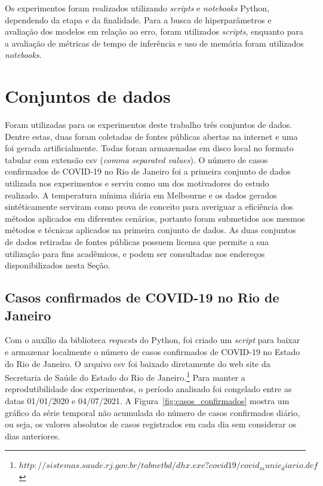 Os experimentos foram realizados utilizando \textit{scripts} e \textit{notebooks} Python, dependendo da etapa e da finalidade. Para a busca de hiperparâmetros e avaliação dos modelos em relação ao erro, foram utilizados \textit{scripts}, enquanto para a avaliação de métricas de tempo de inferência e uso de memória foram utilizados \textit{notebooks}.

\section{Conjuntos de dados}
Foram utilizadas para os experimentos deste trabalho três conjuntos de dados. Dentre estas, duas foram coletadas de fontes públicas abertas na internet e uma foi gerada artificialmente. Todas foram armazenadas em disco local no formato tabular com extensão csv (\textit{comma separated values}). O número de casos confirmados de COVID-19 no Rio de Janeiro foi a primeira conjunto de dados utilizada nos experimentos e serviu como um dos motivadores do estudo realizado. A temperatura mínima diária em Melbourne e os dados gerados sintéticamente serviram como prova de conceito para averiguar a eficiência dos métodos aplicados em diferentes cenários, portanto foram submetidos aos mesmos métodos e técnicas aplicados na primeira conjunto de dados. As duas conjuntos de dados retiradas de fontes públicas possuem licensa que permite a sua utilização para fins acadêmicos, e podem ser consultadas nos endereços disponibilizados nesta Seção.

\subsection{Casos confirmados de COVID-19 no Rio de Janeiro}\label{subsec:casos_confirmados}
Com o auxílio da biblioteca \textit{requests} do Python, foi criado um \textit{script} para baixar e armazenar localmente o número de casos confirmados de COVID-19 no Estado do Rio de Janeiro. O arquivo csv foi baixado diretamente do web site da Secretaria de Saúde do Estado do Rio de Janeiro.\footnote{$http://sistemas.saude.rj.gov.br/tabnetbd/dhx.exe?covid19/covid_munic_diario.def$} Para manter a reprodutibilidade dos experimentos, o período analisado foi congelado entre as datas 01/01/2020 e 04/07/2021. A Figura~\ref{fig:casos_confirmados} mostra um gráfico da série temporal não acumulada do número de casos confirmados diário, ou seja, os valores absolutos de casos registrados em cada dia sem considerar os dias anteriores.

